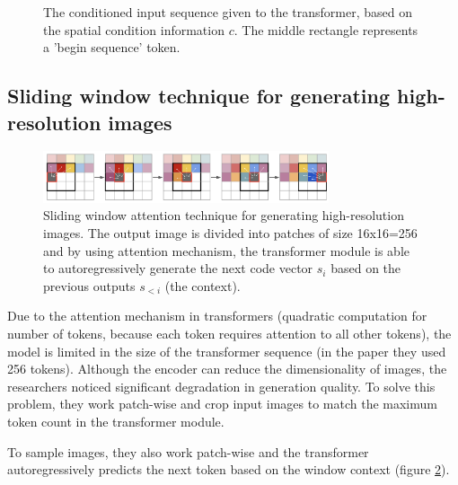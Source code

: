 \begin{figure}
    \centering
    \label{fig:vqgan_conditional_generation}
    \caption{The conditioned input sequence given to the transformer, based on the spatial condition information $c$. The middle rectangle represents a 'begin sequence' token.}
\end{figure}






\subsection{Sliding window technique for generating high-resolution images}

\begin{figure}[h]
    \centering
    \includegraphics[width=0.75\textwidth]{images/vqgan_sliding_attention.png}
    \caption{Sliding window attention technique for generating high-resolution images. The output image is divided into patches of size 16x16=256 and by using attention mechanism, the transformer module is able to autoregressively generate the next code vector $s_i$ based on the previous outputs $s_{<i}$ (the context).}
    \label{fig:vqgan_sliding_window}
\end{figure}

Due to the attention mechanism in transformers (quadratic computation for number of tokens, because each token requires attention to all other tokens), the model is limited in the size of the transformer sequence (in the paper they used 256 tokens). Although the encoder can reduce the dimensionality of images, the researchers noticed significant degradation in generation quality. To solve this problem, they work patch-wise and crop input images to match the maximum token count in the transformer module.

To sample images, they also work patch-wise and the transformer autoregressively predicts the next token based on the window context (figure \ref{fig:vqgan_sliding_window}).

